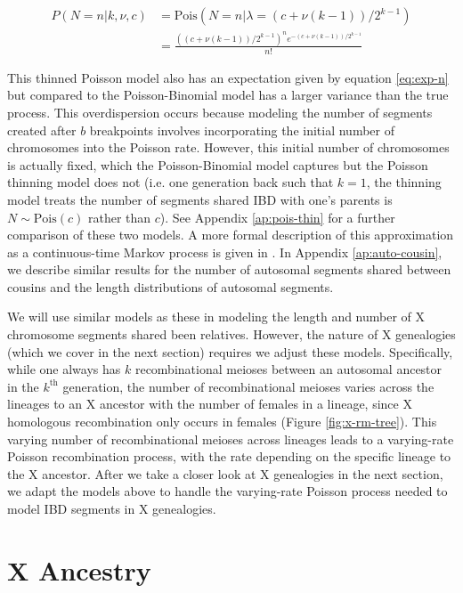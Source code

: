 \documentclass[9pt,twocolumn,twoside]{gsajnl}
\begin{document}
\begin{align}
\label{eq:auto-segment-number}
  P(N = n | k, \nu, c) &= \text{Pois}(N = n | \lambda = (c + \nu (k-1))/2^{k-1}) \nonumber \\
                       &= \frac{((c + \nu (k-1))/2^{k-1})^n  e^{- (c + \nu (k-1))/{2^{k - 1}}}}{n!}
\end{align}

This thinned Poisson model also has an expectation given by equation
\eqref{eq:exp-n} but compared to the Poisson-Binomial model has a larger
variance than the true process. This overdispersion occurs because modeling the
number of segments created after $b$ breakpoints involves incorporating the
initial number of chromosomes into the Poisson rate. However, this initial
number of chromosomes is actually fixed, which the Poisson-Binomial model
captures but the Poisson thinning model does not (i.e. one generation back such
that $k=1$, the thinning model treats the number of segments shared IBD with
one's parents is $N \sim \text{Pois}(c)$ rather than $c$). See Appendix
\ref{ap:pois-thin} for a further comparison of these two models. A more formal
description of this approximation as a continuous-time Markov process is given
in \citet{thomas:1994hg}. In Appendix \ref{ap:auto-cousin}, we describe
similar results for the number of autosomal segments shared between cousins and
the length distributions of autosomal segments.

We will use similar models as these in modeling the length and number of X
chromosome segments shared been relatives. However, the nature of X genealogies
(which we cover in the next section) requires we adjust these models.
Specifically, while one always has $k$ recombinational meioses between an
autosomal ancestor in the $k^\text{th}$ generation, the number of
recombinational meioses varies across the lineages to an X ancestor with the
number of females in a lineage, since X homologous recombination only occurs in
females (Figure \ref{fig:x-rm-tree}). This varying number of recombinational
meioses across lineages leads to a varying-rate Poisson recombination process,
with the rate depending on the specific lineage to the X ancestor. After we
take a closer look at X genealogies in the next section, we adapt the models
above to handle the varying-rate Poisson process needed to model IBD segments
in X genealogies.

\section*{X Ancestry}
\label{sec:x-ancestry}
\end{document}
